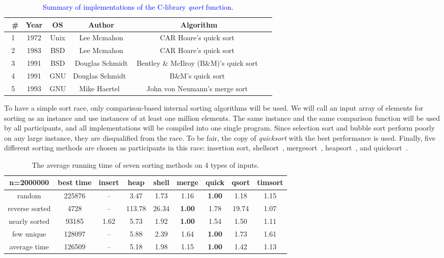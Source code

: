 \documentclass[AMA,STIX1COL]{WileyNJD-v2}
\newcommand{\qusort}{\emph{quicksort }}
\newcommand{\qsort}{\emph{qsort }}
\begin{document}
\begin{table}
\caption{\textcolor{blue}{Summary of implementations of the C-library \qsort function.}}
\centering
\begin{tabular}{|c|c|c|c|c|c|}
\toprule\
\# & Year & OS & Author & Algorithm\\
\midrule
1 & 1972 & Unix & Lee Mcmahon & CAR Hoare's quick sort~\cite{hoare1961algorithm}\\
2 & 1983 & BSD & Lee Mcmahon & CAR Hoare's quick sort~\cite{hoare1961algorithm}\\
3 & 1991 & BSD & Douglas Schmidt & Bentley \& McIlroy (B\&M)’s quick sort~\cite{bentley1993engineering}\\
4 & 1991 & GNU & Douglas Schmidt~\cite{gnuqsort} & B\&M’s quick sort~\cite{bentley1993engineering}\\
5 & 1993 & GNU & Mike Haertel~\cite{gnumergesort} & John von Neumann's merge sort~\cite{knuth1998sorting}\\
\bottomrule
\end{tabular}
\label{qsortalgo}
\end{table}
To have a simple sort race, only comparison-based internal sorting algorithms will be used. 
We will call an input array of elements for sorting as an instance and use instances of at least one million elements. 
The same instance and the same comparison function will be used by all participants, and all implementations will be compiled into one single program. 
Since selection sort and bubble sort perform poorly on any large instance, they are disqualified from the race. 
To be fair, the copy of \qusort with the best performance is used.
Finally, five different sorting methods are chosen as participants in this race: insertion sort, shellsort~\cite{knuth1998sorting}, mergesort~\cite{mcilroy1993optimistic}, heapsort~\cite{williams1964algorithm}, and quicksort~\cite{hoare1961algorithm}.

\begin{table}
\caption{The average running time of seven sorting methods on 4 types of inputs.}
\centering
\begin{tabular}{|c|c|c|c|c|c|c|c|c|}
\toprule
n=2000000 & best time & insert & heap & shell & merge & quick & qsort & timsort\\
\midrule
random & 225876 & -- & 3.47 & 1.73 & 1.16 & \textbf{1.00} & 1.18 & 1.15 \\
reverse sorted&4728&--&113.78&26.34&\textbf{1.00}&1.78&19.74&1.07\\
nearly sorted & 93185&1.62&5.73&1.92&\textbf{1.00} & 1.54 &1.50 &1.11 \\
few unique & 128097 & --	& 5.88 & 2.39 & 1.64 & \textbf{1.00} & 1.73 & 1.61 \\
average time & 126509 & -- &	5.18& 1.98 & 1.15 & \textbf{1.00} & 1.42 & 1.13 \\
\bottomrule
\end{tabular}
\label{table1}
\end{table}
\end{document}
